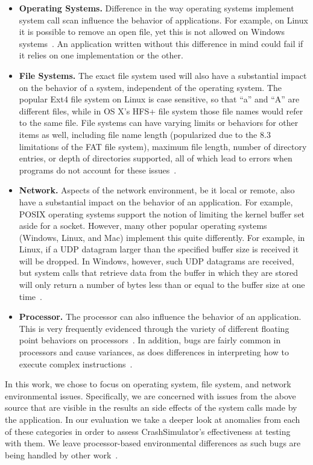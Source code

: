\begin{itemize}

\item {\bf Operating Systems.} Difference in the way operating systems
implement system call scan influence the behavior of applications.  For
example, on Linux it is possible to remove an open file, yet this is not
allowed on Windows systems~\cite{UnlinkStandard}.  An application
written without this difference in mind could fail if it relies on one
implementation or the other.

\item {\bf File Systems.}  The exact file system used will also have a
substantial impact on the behavior of a system, independent of the
operating system.  The popular Ext4 file system on Linux is case sensitive,
so that ``a'' and ``A'' are different files, while in OS X's HFS+ file system
those file names would refer to the same file.
File systems can have varying limits or behaviors for other items as well,
including file name length (popularized due to the 8.3 limitations of the
FAT file system), maximum file length, number of directory entries, or
depth
of directories supported, all of which lead to errors when programs
do not account for these issues~\cite{EXT4Layout, AppleHFS}.

\item {\bf Network.}  Aspects of the network environment, be it local or
remote, also have a
substantial impact on the behavior of an application.
For example, POSIX operating
systems support the notion of limiting the kernel buffer set aside for a
socket.  However, many other popular operating
systems (Windows, Linux, and Mac)
implement this quite differently.  For example, in Linux, if a UDP datagram
larger than the specified buffer size is received it will be dropped.  In
Windows, however, such
UDP datagrams are
received, but system calls that retrieve data from the buffer in which
they are
stored will only return a number of bytes less than or equal to the
buffer size at one time~\cite{Zhuang_NSDI_2014}.

\item {\bf Processor.}  The processor can also influence the
behavior of an application.  This is very frequently
evidenced through the variety of different floating point behaviors on
processors~\cite{ArbitraryPrecision}.  In addition, bugs are fairly common
in processors and cause variances, as does differences in interpreting
how to execute complex instructions~\cite{Microarch}.

\end{itemize}


In this work, we chose to focus on operating system,
file system, and network
environmental issues.
Specifically, we are concerned with issues from the above source that are
visible in the results an side effects of the system calls made by the
application.  In our evaluation we take a deeper look at anomalies from
each of these categories in order to assess CrashSimulator's effectiveness
at testing with them.
We leave processor-based environmental differences as such
bugs are being handled by other
work~\cite{Alglave:2018:FSC:3173162.3177156}.
